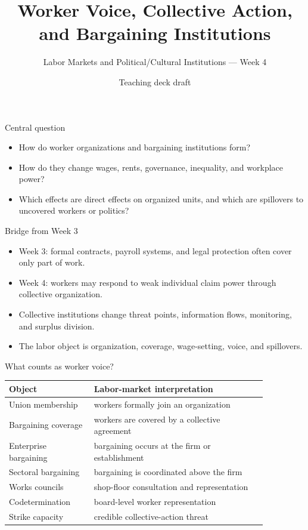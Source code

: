 \documentclass[aspectratio=169,11pt]{beamer}
\title{Worker Voice, Collective Action, and Bargaining Institutions}
\subtitle{Labor Markets and Political/Cultural Institutions --- Week 4}
\author{Teaching deck draft}
\date{}
\begin{document}
\begin{frame}
  \titlepage
\end{frame}

\begin{frame}{Central question}
\begin{itemize}
    \item How do worker organizations and bargaining institutions form?
    \item How do they change wages, rents, governance, inequality, and workplace power?
    \item Which effects are direct effects on organized units, and which are spillovers to uncovered workers or politics?
\end{itemize}
\end{frame}

\begin{frame}{Bridge from Week 3}
\begin{itemize}
    \item Week 3: formal contracts, payroll systems, and legal protection often cover only part of work.
    \item Week 4: workers may respond to weak individual claim power through collective organization.
    \item Collective institutions change threat points, information flows, monitoring, and surplus division.
    \item The labor object is organization, coverage, wage-setting, voice, and spillovers.
\end{itemize}
\end{frame}

\begin{frame}{What counts as worker voice?}
\small
\begin{tabular}{p{0.28\linewidth} p{0.58\linewidth}}
\toprule
Object & Labor-market interpretation \\
\midrule
Union membership & workers formally join an organization \\
Bargaining coverage & workers are covered by a collective agreement \\
Enterprise bargaining & bargaining occurs at the firm or establishment \\
Sectoral bargaining & bargaining is coordinated above the firm \\
Works councils & shop-floor consultation and representation \\
Codetermination & board-level worker representation \\
Strike capacity & credible collective-action threat \\
\bottomrule
\end{tabular}
\end{frame}
\end{document}
